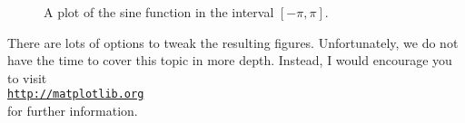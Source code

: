 \documentclass{article}
\begin{document}
\begin{figure}[!ht]
  \centering
  \caption{A plot of the sine function in the interval $[-\pi, \pi]$.}
  \label{fig:sine.eps}
\end{figure}
There are lots of options to tweak the resulting figures.  Unfortunately, we do not have the time to
cover this topic in more depth.  Instead, I would encourage you to visit
\\[0.2cm]
\hspace*{1.3cm}
\href{http://matplotlib.org}{\texttt{http://matplotlib.org}}
\\[0.2cm]
for further information.
\end{document}
